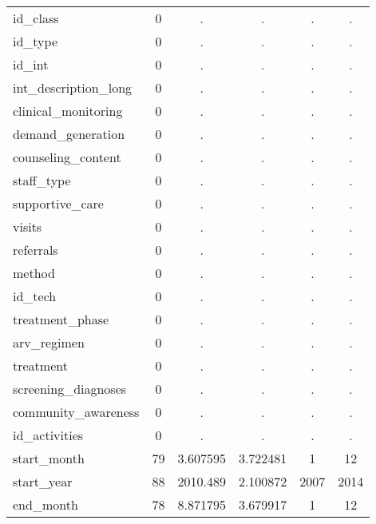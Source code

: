 \begin{table}[htbp]
\begin{tabular}{l*{1}{ccccc}}
id\_class    &           0&           .&           .&           .&           .\\
id\_type     &           0&           .&           .&           .&           .\\
id\_int      &           0&           .&           .&           .&           .\\
int\_description\_long&           0&           .&           .&           .&           .\\
clinical\_monitoring&           0&           .&           .&           .&           .\\
demand\_generation&           0&           .&           .&           .&           .\\
counseling\_content&           0&           .&           .&           .&           .\\
staff\_type  &           0&           .&           .&           .&           .\\
supportive\_care&           0&           .&           .&           .&           .\\
visits      &           0&           .&           .&           .&           .\\
referrals   &           0&           .&           .&           .&           .\\
method      &           0&           .&           .&           .&           .\\
id\_tech     &           0&           .&           .&           .&           .\\
treatment\_phase&           0&           .&           .&           .&           .\\
arv\_regimen &           0&           .&           .&           .&           .\\
treatment   &           0&           .&           .&           .&           .\\
screening\_diagnoses&           0&           .&           .&           .&           .\\
community\_awareness&           0&           .&           .&           .&           .\\
id\_activities&           0&           .&           .&           .&           .\\
start\_month &          79&    3.607595&    3.722481&           1&          12\\
start\_year  &          88&    2010.489&    2.100872&        2007&        2014\\
end\_month   &          78&    8.871795&    3.679917&           1&          12\\

\end{tabular}
\end{table}
